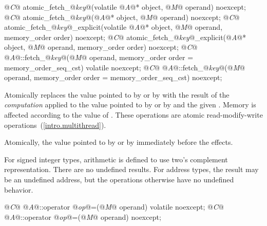 %
%
%
%
\begin{itemdecl}
@\textit{C}@ atomic_fetch_@\textit{key}@(volatile @\textit{A}@* object, @\textit{M}@ operand) noexcept;
@\textit{C}@ atomic_fetch_@\textit{key}@(@\textit{A}@* object, @\textit{M}@ operand) noexcept;
@\textit{C}@ atomic_fetch_@\textit{key}@_explicit(volatile @\textit{A}@* object, @\textit{M}@ operand, memory_order order) noexcept;
@\textit{C}@ atomic_fetch_@\textit{key}@_explicit(@\textit{A}@* object, @\textit{M}@ operand, memory_order order) noexcept;
@\textit{C}@ @\textit{A}@::fetch_@\textit{key}@(@\textit{M}@ operand, memory_order order = memory_order_seq_cst) volatile noexcept;
@\textit{C}@ @\textit{A}@::fetch_@\textit{key}@(@\textit{M}@ operand, memory_order order = memory_order_seq_cst) noexcept;
\end{itemdecl}

\begin{itemdescr}
\pnum
\effects Atomically replaces the value pointed to by  or by
 with the result of the \textit{computation} applied to the
value pointed to by  or by  and the given .
Memory is affected according to the value of .
These operations are atomic read-modify-write operations~(\ref{intro.multithread}).

\pnum
\returns Atomically, the value pointed to by  or by  immediately before the effects.

\pnum
\note For signed integer types, arithmetic is defined to use two's complement
representation. There are no undefined results. For address types, the result may be an
undefined address, but the operations otherwise have no undefined behavior.
\end{itemdescr}

%
%
\begin{itemdecl}
@\textit{C}@ @\textit{A}@::operator @\textit{op}@=(@\textit{M}@ operand) volatile noexcept;
@\textit{C}@ @\textit{A}@::operator @\textit{op}@=(@\textit{M}@ operand) noexcept;
\end{itemdecl}

\begin{itemdescr}
\pnum
\effects {}

\pnum
\returns {}
\end{itemdescr}

